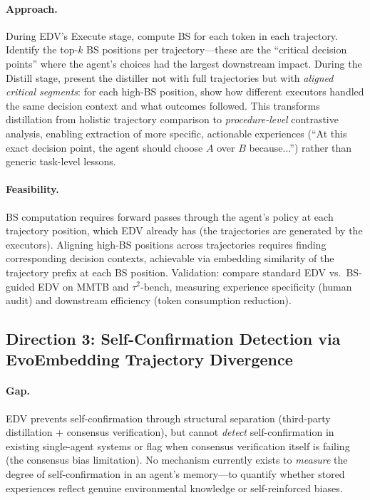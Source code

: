 \documentclass[11pt,a4paper]{article}
\begin{document}
\paragraph{Approach.} During EDV's Execute stage, compute BS for each token in each trajectory. Identify the top-$k$ BS positions per trajectory---these are the ``critical decision points'' where the agent's choices had the largest downstream impact. During the Distill stage, present the distiller not with full trajectories but with \emph{aligned critical segments}: for each high-BS position, show how different executors handled the same decision context and what outcomes followed. This transforms distillation from holistic trajectory comparison to \emph{procedure-level} contrastive analysis, enabling extraction of more specific, actionable experiences (``At this exact decision point, the agent should choose $A$ over $B$ because...'') rather than generic task-level lessons.

\paragraph{Feasibility.} BS computation requires forward passes through the agent's policy at each trajectory position, which EDV already has (the trajectories are generated by the executors). Aligning high-BS positions across trajectories requires finding corresponding decision contexts, achievable via embedding similarity of the trajectory prefix at each BS position. Validation: compare standard EDV vs.\ BS-guided EDV on MMTB and $\tau^2$-bench, measuring experience specificity (human audit) and downstream efficiency (token consumption reduction).

\subsection{Direction 3: Self-Confirmation Detection via EvoEmbedding Trajectory Divergence}

\paragraph{Gap.} EDV prevents self-confirmation through structural separation (third-party distillation + consensus verification), but cannot \emph{detect} self-confirmation in existing single-agent systems or flag when consensus verification itself is failing (the consensus bias limitation). No mechanism currently exists to \emph{measure} the degree of self-confirmation in an agent's memory---to quantify whether stored experiences reflect genuine environmental knowledge or self-reinforced biases.
\end{document}
